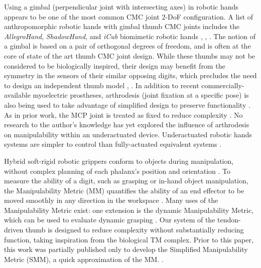 \documentclass[journal]{IEEEtran}
\begin{document}
 Using a gimbal (perpendicular joint with intersecting axes) in robotic hands appears to be one of the most common CMC joint 2-DoF configuration. A list of anthropomorphic robotic hands with gimbal thumb CMC joints includes the {\it AllegroHand}, {\it ShadowHand}, and {\it iCub} biomimetic robotic hands \cite{ShadowHand}, \cite{iCub}, \cite{KITECH-Hand}. The notion of a gimbal is based on a pair of orthogonal degrees of freedom, and is often at the core of state of the art thumb CMC joint design. While these thumbs may not be considered to be biologically inspired, their design may benefit from the symmetry in the sensors of their similar opposing digits, which precludes the need to design an independent thumb model \cite{DLRhand}, \cite{schunkhand}. In addition to recent commercially-available myoelectric prostheses, arthrodesis (joint fixation at a specific pose) is also being used to take advantage of simplified design to preserve functionality \cite{bebionic}. As in prior work, the MCP joint is treated as fixed to reduce complexity \cite{Pulleyking}. No research to the author's knowledge has yet explored the influence of arthrodesis on manipulability within an underactuated device. Underactuated robotic hands systems are simpler to control than fully-actuated equivalent systems \cite{AdaptUnderact}. 



Hybrid soft-rigid robotic grippers conform to objects during manipulation, without complex planning of each phalanx's position and orientation \cite{softrigid}. To measure the ability of a digit, such as grasping or in-hand object manipulation, the Manipulability Metric (MM) quantifies the ability of an end effector to be moved smoothly in any direction in the workspace \cite{Yoshikawa}. Many uses of the Manipulability Metric exist: one extension is the dynamic Manipulability Metric, which can be used to evaluate dynamic grasping \cite{yokokohjiDME}. Our system of the tendon-driven thumb is designed to reduce complexity without substantially reducing function, taking inspiration from the biological TM complex. Prior to this paper, this work was partially published only to develop the Simplified Manipulability Metric (SMM), a quick approximation of the MM. \cite{Pulleyking-Schultz}. 
\end{document}
